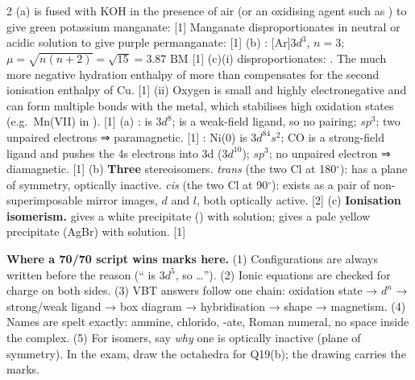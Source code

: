 \documentclass[10pt,a4paper]{extarticle}
\newcommand{\mk}[1]{{\scriptsize\color{black!55}[#1]}}
\begin{document}
\begin{multicols}{2}
\An (a)  is fused with KOH in the presence of air (or an oxidising agent such as ) to give green potassium manganate:\nl
{} \mk{1}\nl
Manganate disproportionates in neutral or acidic solution to give purple permanganate:\nl
{} \mk{1}\nl
(b) : [Ar]$3d^3$, $n=3$; $\mu=\sqrt{n(n+2)}=\sqrt{15}=\boxed{3.87\text{ BM}}$ \mk{1}\nl
(c)(i)  disproportionates: . The much more negative hydration enthalpy of  more than compensates for the second ionisation enthalpy of Cu. \mk{1}\nl
(ii) Oxygen is small and highly electronegative and can form multiple bonds with the metal, which stabilises high oxidation states (e.g.\ Mn(VII) in ). \mk{1}
\An (a) :  is $3d^8$;  is a weak-field ligand, so no pairing; $sp^3$; two unpaired electrons ⇒ paramagnetic. \mk{1}\nl
\ce{[Ni(CO)4]}: Ni(0) is $3d^84s^2$; CO is a strong-field ligand and pushes the 4s electrons into 3d ($3d^{10}$); $sp^3$; no unpaired electron ⇒ diamagnetic. \mk{1}\nl
(b) \textbf{Three} stereoisomers. \emph{trans} (the two Cl at 180$^\circ$): has a plane of symmetry, optically inactive. \emph{cis} (the two Cl at 90$^\circ$): exists as a pair of non-superimposable mirror images, $d$ and $l$, both optically active. \mk{2}\nl
(c) \textbf{Ionisation isomerism.}  gives a white precipitate () with  solution;  gives a pale yellow precipitate (AgBr) with  solution. \mk{1}
\end{multicols}
\begin{tcolorbox}[enhanced,colback=tipY,colframe=tipYframe,boxrule=0.5pt,arc=1.5pt,left=4pt,right=4pt,top=2pt,bottom=2pt,before skip=4pt]
\footnotesize\textbf{Where a 70/70 script wins marks here.} (1) Configurations are always written before the reason (`` is $3d^5$, so …''). (2) Ionic equations are checked for charge on both sides. (3) VBT answers follow one chain: oxidation state → $d^n$ → strong/weak ligand → box diagram → hybridisation → shape → magnetism. (4) Names are spelt exactly: ammine, chlorido, -ate, Roman numeral, no space inside the complex. (5) For isomers, say \emph{why} one is optically inactive (plane of symmetry). In the exam, draw the octahedra for Q19(b); the drawing carries the marks.
\end{tcolorbox}
\end{document}
